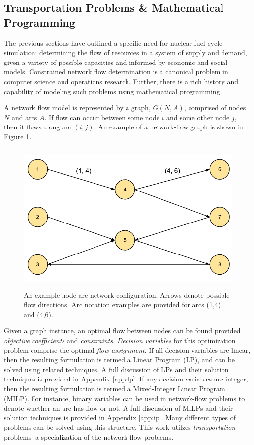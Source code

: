 \subsection{Transportation Problems \& Mathematical Programming}\label{intro:prog}

The previous sections have outlined a specific need for nuclear fuel cycle
simulation: determining the flow of resources in a system of supply and demand,
given a variety of possible capacities and informed by economic and social
models. Constrained network flow determination is a canonical problem in
computer science and operations research. Further, there is a rich history and
capability of modeling such problems using mathematical programming.

A network flow model is represented by a graph, $G(N, A)$, comprised of nodes
$N$ and arcs $A$. If flow can occur between some node $i$ and some other node
$j$, then it flows along arc $(i, j)$. An example of a network-flow graph is
shown in Figure \ref{fig:node-arcs}.

\begin{figure}[H]
  \begin{center}
    \includegraphics[height=7.5cm]{./chapters/1-intro/figs/node-arcs.png}
  \caption{An example node-arc network configuration. Arrows denote possible
    flow directions. Arc notation examples are provided for arcs (1,4) and
    (4,6).}
  \label{fig:node-arcs}
  \end{center}
\end{figure}

Given a graph instance, an optimal flow between nodes can be found provided
\textit{objective coefficients} and \textit{constraints}. \textit{Decision
  variables} for this optimization problem comprise the optimal \textit{flow
  assignment}. If all decision variables are linear, then the resulting
formulation is termed a Linear Program (LP), and can be solved using related
techniques. A full discussion of LPs and their solution techniques is provided
in Appendix \ref{app:lp}. If any decision variables are integer, then the
resulting formulation is termed a Mixed-Integer Linear Program (MILP). For
instance, binary variables can be used in network-flow problems to denote
whether an arc has flow or not. A full discussion of MILPs and their solution
techniques is provided in Appendix \ref{app:ip}. Many different types of
problems can be solved using this structure. This work utilzes
\textit{transportation} problems, a specialization of the network-flow problems.

